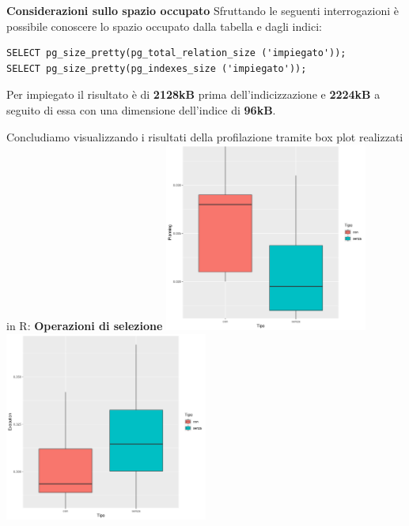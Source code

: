 \documentclass{article}
\begin{document}
\noindent
\newline
\textbf{Considerazioni sullo spazio occupato}
\newline
\newline
Sfruttando le seguenti interrogazioni è possibile conoscere lo spazio occupato dalla tabella e dagli indici:
\begin{verbatim}
SELECT pg_size_pretty(pg_total_relation_size ('impiegato'));
SELECT pg_size_pretty(pg_indexes_size ('impiegato'));
\end{verbatim}
Per impiegato il risultato è di \textbf{2128kB} prima dell'indicizzazione e \textbf{2224kB} a seguito di essa con una dimensione dell'indice di \textbf{96kB}.

\newpage
\noindent
\newline
Concludiamo visualizzando i risultati della profilazione tramite box plot realizzati in R:
\newline
\newline
\textbf{Operazioni di selezione}
\newline
\newline
\includegraphics[width=0.5\textwidth]{planning_impiegato_qualifica_selezione.png}
\includegraphics[width=0.5\textwidth]{execution_impiegato_qualifica_selezione.png}
\newline
\newline
\end{document}
